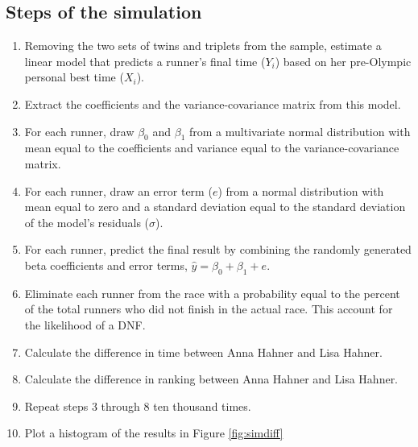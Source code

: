 \documentclass[12pt,titlepage]{article}
\begin{document}
\newpage
\subsection*{Steps of the simulation}

\begin{enumerate}
\item Removing the two sets of twins and triplets from the sample,
  estimate a linear model that predicts a runner's final time ($Y_i$)
  based on her pre-Olympic personal best time ($X_i$).
\item Extract the coefficients and the variance-covariance matrix from
  this model.
\item For each runner, draw $\beta_0$ and $\beta_1$ from a multivariate normal
distribution with mean equal to the coefficients and variance equal to the
variance-covariance matrix.
\item For each runner, draw an error term ($e$) from a normal distribution with
mean equal to zero and a standard deviation equal to the standard
deviation of the model's residuals ($\sigma$).
\item For each runner, predict the final result by combining the randomly
  generated beta coefficients and error terms, $\hat{y} = \beta_0 + \beta_1 + e$.
\item Eliminate each runner from the race with a probability equal to the
percent of the total runners who did not finish in the actual race.  This
account for the likelihood of a DNF.
\item Calculate the difference in time between Anna Hahner and Lisa Hahner.
\item Calculate the difference in ranking between Anna Hahner and Lisa Hahner.
\item Repeat steps 3 through 8 ten thousand times.
\item Plot a histogram of the results in Figure \ref{fig:simdiff}
\end{enumerate}
\end{document}
